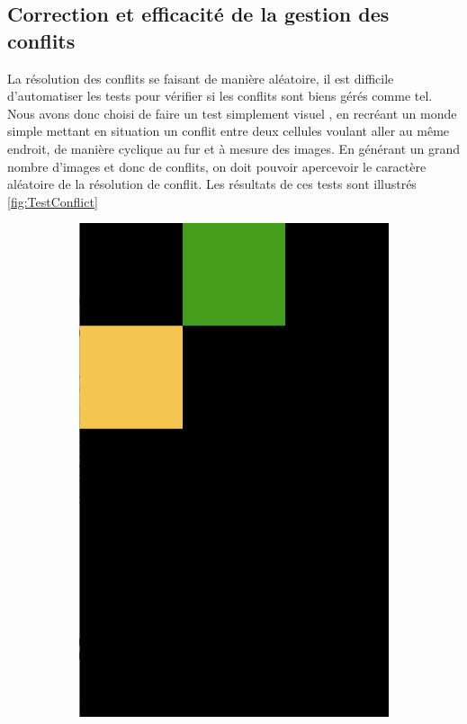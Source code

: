\subsection{Correction et efficacité de la gestion des conflits}
La résolution des conflits se faisant de manière aléatoire, il est difficile d'automatiser les tests pour vérifier si les conflits sont biens gérés comme tel. Nous avons donc choisi de faire un test simplement \og visuel \fg{}, en recréant un monde simple mettant en situation un conflit entre deux cellules voulant aller au même endroit, de manière cyclique au fur et à mesure des images. En générant un grand nombre d'images et donc de conflits, on doit pouvoir apercevoir le caractère aléatoire de la résolution de conflit. Les résultats de ces tests sont illustrés 
\autoref{fig:TestConflict}
\begin{figure}[ht]
    \centering
    \begin{subfigure}{0.2\textwidth}
        \includegraphics[width=\textwidth]{TestConflict1.png}

\end{subfigure}
\end{figure}
